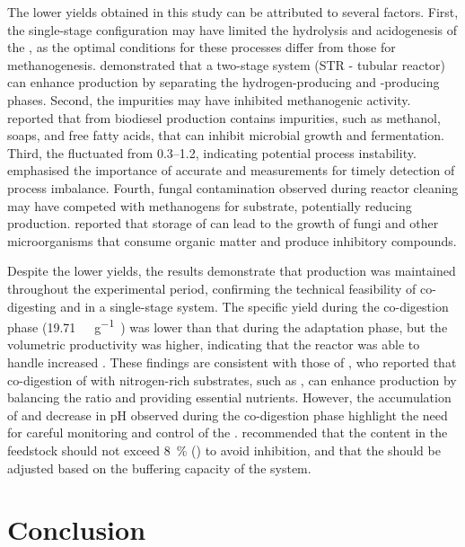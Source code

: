 \documentclass[12pt, a4paper, oneside]{report}
\begin{document}
The lower  yields obtained in this study can be attributed to several factors. First, the single-stage configuration may have limited the hydrolysis and acidogenesis of the , as the optimal conditions for these processes differ from those for methanogenesis. \textcite{srimachai2025} demonstrated that a two-stage system (STR - tubular reactor) can enhance  production by separating the hydrogen-producing and -producing phases. Second, the  impurities may have inhibited methanogenic activity. \textcite{anand2012} reported that  from biodiesel production contains impurities, such as methanol, soaps, and free fatty acids, that can inhibit microbial growth and fermentation. Third, the  fluctuated from \numrange{0.3}{1.2}, indicating potential process instability. \textcite{ribas2007} emphasised the importance of accurate  and  measurements for timely detection of process imbalance. Fourth, fungal contamination observed during reactor cleaning may have competed with methanogens for substrate, potentially reducing  production. \textcite{degueurce2020} reported that storage of  can lead to the growth of fungi and other microorganisms that consume organic matter and produce inhibitory compounds.

Despite the lower yields, the results demonstrate that  production was maintained throughout the experimental period, confirming the technical feasibility of co-digesting  and  in a single-stage system. The specific  yield during the co-digestion phase (\qty{19.71}{\nml\CH\per\gram\VSfed}) was lower than that during the adaptation phase, but the volumetric productivity was higher, indicating that the reactor was able to handle increased . These findings are consistent with those of \textcite{gebreegziabher2025}, who reported that co-digestion of  with nitrogen-rich substrates, such as , can enhance  production by balancing the  ratio and providing essential nutrients. However, the accumulation of  and decrease in pH observed during the co-digestion phase highlight the need for careful monitoring and control of the . \textcite{tomczak2025} recommended that the  content in the feedstock should not exceed \qty{8}{\percent} () to avoid inhibition, and that the  should be adjusted based on the buffering capacity of the system.
\clearpage{}
\clearpage{}\chapter{Conclusion}
\label{ch:conclusion}
\end{document}
